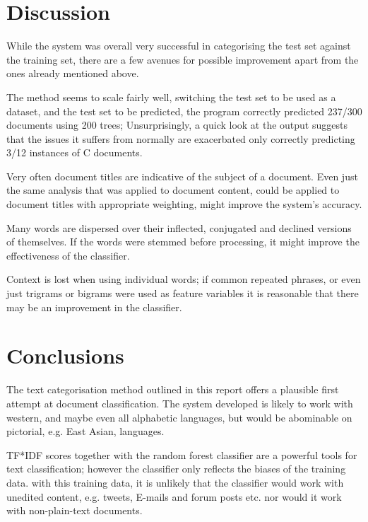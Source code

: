 \documentclass[11pt]{article}
\begin{document}
\section{Discussion}

While the system was overall very successful in categorising the test set
against the training set, there are a few avenues for possible improvement
apart from the ones already mentioned above.

The method seems to scale fairly well, switching the test set to be used as a
dataset, and the test set to be predicted, the program correctly predicted
237/300 documents using 200 trees; Unsurprisingly, a quick look at the output
suggests that the issues it suffers from normally are exacerbated only
correctly predicting 3/12 instances of C documents.

Very often document titles are indicative of the subject of a document. Even
just the same analysis that was applied to document content, could be applied
to document titles with appropriate weighting, might improve the system's
accuracy.

Many words are dispersed over their inflected, conjugated and declined
versions of themselves. If the words were stemmed before processing, it might
improve the effectiveness of the classifier.

Context is lost when using individual words; if common repeated phrases, or even
just trigrams or bigrams were used as feature variables it is reasonable that
there may be an improvement in the classifier.

\section{Conclusions}

The text categorisation method outlined in this report offers a plausible first
attempt at document classification. The system developed is likely to work with
western, and maybe even all alphabetic languages, but would be abominable on
pictorial, e.g. East Asian, languages. 

TF*IDF scores together with the random forest classifier are a powerful tools
for text classification; however the classifier only reflects the biases of the
training data. with this training data, it is unlikely that the classifier
would work with unedited content, e.g.  tweets, E-mails and forum posts etc.
nor would it work with non-plain-text documents.



\nocite{*}
\end{document}
